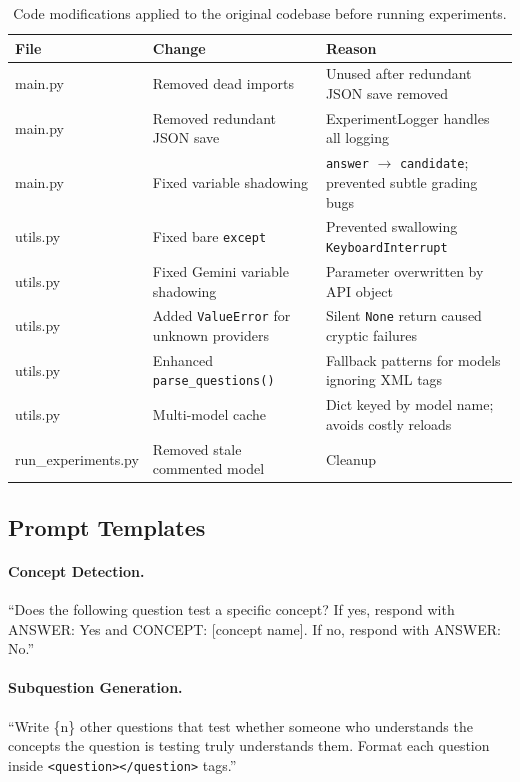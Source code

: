 \documentclass[sigconf,authordraft]{acmart}
\begin{document}
\begin{table}[h]
\small
\centering
\setlength{\tabcolsep}{3pt}
\renewcommand{\arraystretch}{1.1}
\begin{tabularx}{\columnwidth}{l l X}
\toprule
\textbf{File} & \textbf{Change} & \textbf{Reason} \\
\midrule
main.py & Removed dead imports & Unused after redundant JSON save removed \\
main.py & Removed redundant JSON save & ExperimentLogger handles all logging \\
main.py & Fixed variable shadowing & \texttt{answer} $\to$ \texttt{candidate}; prevented subtle grading bugs \\
utils.py & Fixed bare \texttt{except} & Prevented swallowing \texttt{KeyboardInterrupt} \\
utils.py & Fixed Gemini variable shadowing & Parameter overwritten by API object \\
utils.py & Added \texttt{ValueError} for unknown providers & Silent \texttt{None} return caused cryptic failures \\
utils.py & Enhanced \texttt{parse\_questions()} & Fallback patterns for models ignoring XML tags \\
utils.py & Multi-model cache & Dict keyed by model name; avoids costly reloads \\
run\_experiments.py & Removed stale commented model & Cleanup \\
\bottomrule
\end{tabularx}
\caption{Code modifications applied to the original codebase before running experiments.}
\label{tab:modifications}
\end{table}

\subsection{Prompt Templates}

\paragraph{Concept Detection.} ``Does the following question test a specific concept? If yes, respond with ANSWER: Yes and CONCEPT: [concept name]. If no, respond with ANSWER: No.''

\paragraph{Subquestion Generation.} ``Write \{n\} other questions that test whether someone who understands the concepts the question is testing truly understands them. Format each question inside \texttt{<question></question>} tags.''
\end{document}

